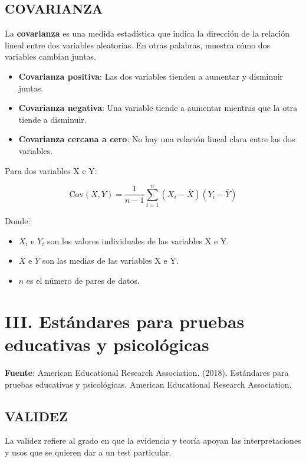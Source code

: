 \documentclass[
  letterpaper,
  DIV=11,
  numbers=noendperiod]{scrreprt}
\providecommand{\tightlist}{%
  \setlength{\itemsep}{0pt}\setlength{\parskip}{0pt}}
\begin{document}
\section{COVARIANZA}\label{covarianza}

La \textbf{covarianza} es una medida estadística que indica la dirección
de la relación lineal entre dos variables aleatorias. En otras palabras,
muestra cómo dos variables cambian juntas.

\begin{itemize}
\tightlist
\item
  \textbf{Covarianza positiva}: Las dos variables tienden a aumentar y
  disminuir juntas.
\item
  \textbf{Covarianza negativa}: Una variable tiende a aumentar mientras
  que la otra tiende a disminuir.
\item
  \textbf{Covarianza cercana a cero}: No hay una relación lineal clara
  entre las dos variables.
\end{itemize}

Para dos variables X e Y:

\[
\text{Cov}(X, Y) = \frac{1}{n-1} \sum_{i=1}^{n} (X_i - \bar{X}) (Y_i - \bar{Y})
\]

Donde:

\begin{itemize}
\tightlist
\item
  \(X_i\) e \(Y_i\) son los valores individuales de las variables X e Y.
\item
  \(\bar{X}\) e \(\bar{Y}\) son las medias de las variables X e Y.
\item
  \(n\) es el número de pares de datos.
\end{itemize}

\chapter{III. Estándares para pruebas educativas y
psicológicas}\label{iii.-estuxe1ndares-para-pruebas-educativas-y-psicoluxf3gicas}

\textbf{Fuente}: American Educational Research Association. (2018).
Estándares para pruebas educativas y psicológicas. American Educational
Research Association.

\section{VALIDEZ}

La validez refiere al grado en que la evidencia y teoría apoyan las
interpretaciones y usos que se quieren dar a un test particular.
\end{document}
